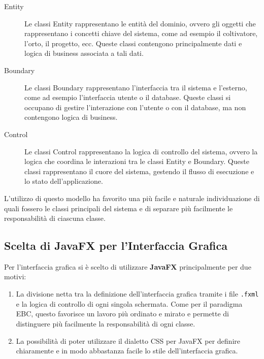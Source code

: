 \documentclass[12pt,a4paper]{article}
\begin{document}
\begin{description}
    \item[Entity] Le classi Entity rappresentano le entità del dominio, ovvero gli oggetti
        che rappresentano i concetti chiave del sistema, come ad esempio il coltivatore,
        l'orto, il progetto, ecc. Queste classi contengono principalmente dati e logica di
        business associata a tali dati.
    \item[Boundary] Le classi Boundary rappresentano l'interfaccia tra il sistema e
        l'esterno, come ad esempio l'interfaccia utente o il database. Queste classi si
        occupano di gestire l'interazione con l'utente o con il database, ma non contengono
        logica di business.
    \item[Control] Le classi Control rappresentano la logica di controllo del sistema,
        ovvero la logica che coordina le interazioni tra le classi Entity e Boundary. Queste
        classi rappresentano il cuore del sistema, gestendo il flusso di esecuzione e lo
        stato dell'applicazione.
\end{description}

L'utilizzo di questo modello ha favorito una più facile e naturale individuazione di quali
fossero le classi principali del sistema e di separare più facilmente le responsabilità di
ciascuna classe.

\subsection{Scelta di JavaFX per l'Interfaccia Grafica}

Per l'interfaccia grafica si è scelto di utilizzare \textbf{JavaFX} principalmente per due
motivi:

\begin{enumerate}
    \item La divisione netta tra la definizione dell'interfaccia grafica tramite i file
        \texttt{.fxml} e la logica di controllo di ogni singola schermata. Come per il
        paradigma EBC, questo favorisce un lavoro più ordinato e mirato e permette di
        distinguere più facilmente la responsabilità di ogni classe.
    \item La possibilità di poter utilizzare il dialetto CSS per JavaFX per definire
        chiaramente e in modo abbastanza facile lo stile dell'interfaccia grafica.
\end{enumerate}

\newpage
\end{document}
